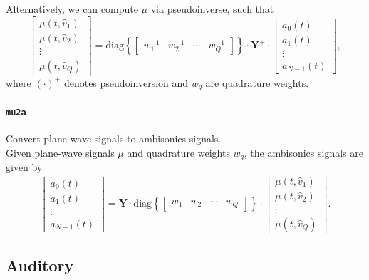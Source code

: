 \documentclass[11pt, oneside]{article}
\newcommand{\function}[1]{\paragraph*{\texttt{#1}}}
\begin{document}
Alternatively, we can compute $\mu$ via pseudoinverse, such that
\begin{equation}\label{eq:a2mu_Pinv}
\begin{bmatrix}
\mu(t,\hat{v}_1) \\ \mu(t,\hat{v}_2) \\ \vdots \\ \mu(t,\hat{v}_Q)
\end{bmatrix}
= \text{diag} \left\{ \begin{bmatrix} w_1^{-1} & w_2^{-1} & \cdots & w_Q^{-1} \end{bmatrix} \right\} \cdot \mathbf{Y}^{+} \cdot
\begin{bmatrix}
a_{0}(t) \\ a_{1}(t) \\ \vdots \\ a_{N-1}(t)
\end{bmatrix},
\end{equation}
where $(\cdot)^{+}$ denotes pseudoinversion and $w_q$ are quadrature weights.

\function{mu2a} Convert plane-wave signals to ambisonics signals. \\
Given plane-wave signals $\mu$ and quadrature weights $w_q$, the ambisonics signals are given by
\begin{equation}
\begin{bmatrix}
a_{0}(t) \\ a_{1}(t) \\ \vdots \\ a_{N-1}(t)
\end{bmatrix}
= \mathbf{Y} \cdot \text{diag} \left\{ \begin{bmatrix} w_1 & w_2 & \cdots & w_Q \end{bmatrix} \right\} \cdot
\begin{bmatrix}
\mu(t,\hat{v}_1) \\ \mu(t,\hat{v}_2) \\ \vdots \\ \mu(t,\hat{v}_Q)
\end{bmatrix}.
\end{equation}

\subsection{Auditory}
\end{document}
